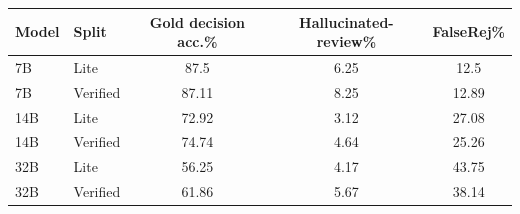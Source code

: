 \begin{tabular}{llccc}
\toprule
Model & Split & Gold decision acc.\% & Hallucinated-review\% & FalseRej\% \\
\midrule
7B & Lite & 87.5 & 6.25 & 12.5 \\
7B & Verified & 87.11 & 8.25 & 12.89 \\
14B & Lite & 72.92 & 3.12 & 27.08 \\
14B & Verified & 74.74 & 4.64 & 25.26 \\
32B & Lite & 56.25 & 4.17 & 43.75 \\
32B & Verified & 61.86 & 5.67 & 38.14 \\
\bottomrule
\end{tabular}
